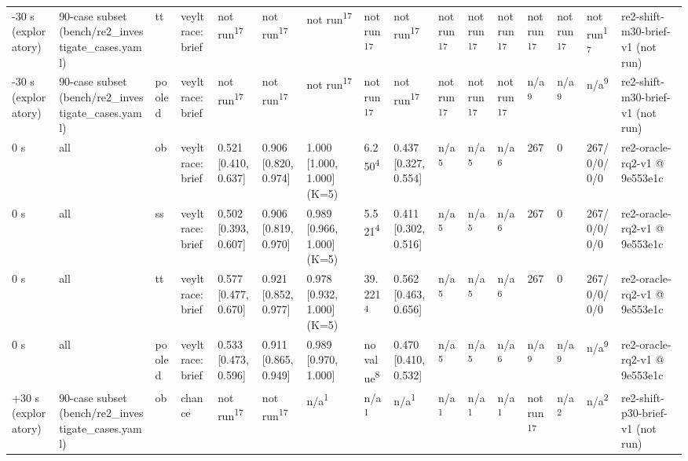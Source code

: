 \begin{table}[t]
\begin{tabular}{llllllllllllllll}
-30 s (exploratory) & 90-case subset (bench/re2\_investigate\_cases.yaml) & tt & veyltrace:brief & not run\textsuperscript{17} & not run\textsuperscript{17} & not run\textsuperscript{17} & not run\textsuperscript{17} & not run\textsuperscript{17} & not run\textsuperscript{17} & not run\textsuperscript{17} & not run\textsuperscript{17} & not run\textsuperscript{17} & not run\textsuperscript{17} & not run\textsuperscript{17} & re2-shift-m30-brief-v1 (not run) \\
-30 s (exploratory) & 90-case subset (bench/re2\_investigate\_cases.yaml) & pooled & veyltrace:brief & not run\textsuperscript{17} & not run\textsuperscript{17} & not run\textsuperscript{17} & not run\textsuperscript{17} & not run\textsuperscript{17} & not run\textsuperscript{17} & not run\textsuperscript{17} & not run\textsuperscript{17} & n/a\textsuperscript{9} & n/a\textsuperscript{9} & n/a\textsuperscript{9} & re2-shift-m30-brief-v1 (not run) \\
0 s & all & ob & veyltrace:brief & 0.521 [0.410, 0.637] & 0.906 [0.820, 0.974] & 1.000 [1.000, 1.000] (K=5) & 6.250\textsuperscript{4} & 0.437 [0.327, 0.554] & n/a\textsuperscript{5} & n/a\textsuperscript{5} & n/a\textsuperscript{6} & 267 & 0 & 267/0/0/0/0 & re2-oracle-rq2-v1 @ 9e553e1c \\
0 s & all & ss & veyltrace:brief & 0.502 [0.393, 0.607] & 0.906 [0.819, 0.970] & 0.989 [0.966, 1.000] (K=5) & 5.521\textsuperscript{4} & 0.411 [0.302, 0.516] & n/a\textsuperscript{5} & n/a\textsuperscript{5} & n/a\textsuperscript{6} & 267 & 0 & 267/0/0/0/0 & re2-oracle-rq2-v1 @ 9e553e1c \\
0 s & all & tt & veyltrace:brief & 0.577 [0.477, 0.670] & 0.921 [0.852, 0.977] & 0.978 [0.932, 1.000] (K=5) & 39.221\textsuperscript{4} & 0.562 [0.463, 0.656] & n/a\textsuperscript{5} & n/a\textsuperscript{5} & n/a\textsuperscript{6} & 267 & 0 & 267/0/0/0/0 & re2-oracle-rq2-v1 @ 9e553e1c \\
0 s & all & pooled & veyltrace:brief & 0.533 [0.473, 0.596] & 0.911 [0.865, 0.949] & 0.989 [0.970, 1.000] & no value\textsuperscript{8} & 0.470 [0.410, 0.532] & n/a\textsuperscript{5} & n/a\textsuperscript{5} & n/a\textsuperscript{6} & n/a\textsuperscript{9} & n/a\textsuperscript{9} & n/a\textsuperscript{9} & re2-oracle-rq2-v1 @ 9e553e1c \\
+30 s (exploratory) & 90-case subset (bench/re2\_investigate\_cases.yaml) & ob & chance & not run\textsuperscript{17} & not run\textsuperscript{17} & n/a\textsuperscript{1} & n/a\textsuperscript{1} & n/a\textsuperscript{1} & n/a\textsuperscript{1} & n/a\textsuperscript{1} & n/a\textsuperscript{1} & not run\textsuperscript{17} & n/a\textsuperscript{2} & n/a\textsuperscript{2} & re2-shift-p30-brief-v1 (not run) \\

\end{tabular}
\end{table}
